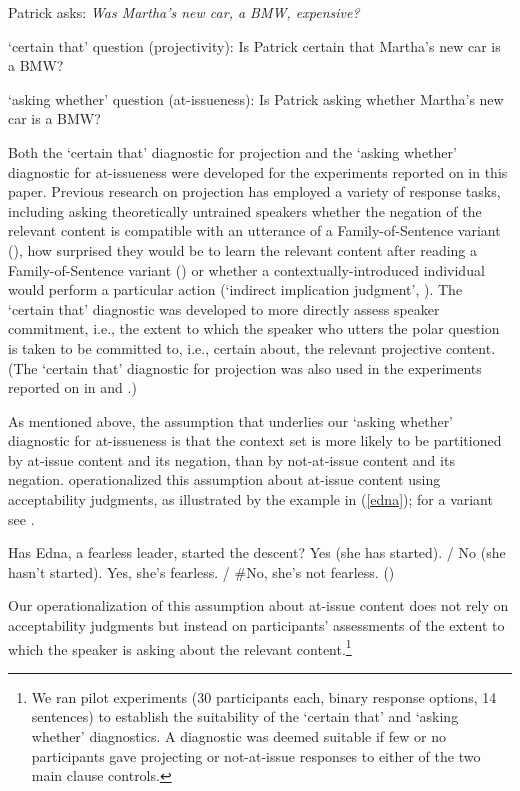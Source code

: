\documentclass[11pt,fleqn]{article}
\newcommand{\6}{\mbox{$[\hspace*{-.6mm}[$}}
\newcommand{\9}{\mbox{$]\hspace*{-.6mm}]$}}
\def\infelic{{\leavevmode\llap{\#}}}
\begin{document}
\begin{exe}

\ex\label{stim} Patrick asks: {\em Was Martha's new car, a BMW, expensive?} 

\begin{xlist}
\ex `certain that' question (projectivity): Is Patrick certain that Martha's new car is a BMW?

\ex `asking whether' question (at-issueness): Is Patrick asking whether Martha's new car is a BMW?

\end{xlist}

\end{exe}
Both the `certain that' diagnostic for projection and the `asking whether' diagnostic for at-issueness were developed for the experiments reported on in this paper. Previous research on projection has employed a variety of response tasks, including asking theoretically untrained speakers whether the negation of the relevant content is compatible with an utterance of a Family-of-Sentence variant (\citealt{xue-onea11}), how surprised they would be to learn the relevant content after reading a Family-of-Sentence variant (\citealt{smith-hall11}) or whether a contextually-introduced individual would perform a particular action (`indirect implication judgment', \citealt{brst-lang11}). The `certain that' diagnostic was developed to more directly assess speaker commitment, i.e., the extent to which the speaker who utters the polar question is taken to be committed to, i.e., certain about, the relevant projective content. (The `certain that' diagnostic for projection was also used in the experiments reported on in  \citealt{tonhauser-salt26} and \citealt*{stevens-etal2017}.)

As mentioned above, the assumption that underlies our `asking whether' diagnostic for at-issueness is that the context set is more likely to be partitioned by at-issue content and its negation, than by not-at-issue content and its negation. \citet{amaral-etal07} operationalized this assumption about at-issue content using acceptability judgments, as illustrated by the example in (\ref{edna}); for a variant see \citealt{tonhauser-sula6}.

\begin{exe}
\ex\label{edna}
\begin{xlist}
 Has Edna, a fearless leader, started the descent?
 Yes (she has started). / No (she hasn't started).
 \infelic Yes, she's fearless. / \#No, she's not fearless. \hfill (\citealt[731]{amaral-etal07})
\end{xlist}
\end{exe}
Our operationalization of this assumption about at-issue content does not rely on acceptability judgments but instead on participants' assessments of the extent to which the speaker is asking about the relevant content.\footnote{We ran pilot experiments (30 participants each, binary response options, 14 sentences) to establish the suitability of the `certain that' and `asking whether' diagnostics. A diagnostic was deemed suitable if few or no participants gave projecting or not-at-issue responses to either of the two main clause controls.}
\end{document}
